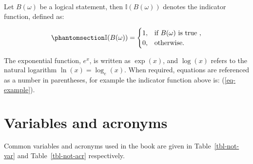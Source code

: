 \documentclass[
  letterpaper,
  krantz2]{style/krantz}
\begin{document}
Let \(B(\omega)\) be a logical statement, then \(\mathbb{I}(B(\omega))\)
denotes the indicator function, defined as:

\begin{equation}\phantomsection\label{eq-example}{
\mathbb{I}(B(\omega))=
\begin{cases}
1, & \text{if } B(\omega) \text{ is true }, \\
0, & \text{otherwise}.
\end{cases}
}\end{equation}

The exponential function, \(e^x\), is written as \(\exp(x)\), and
\(\log(x)\) refers to the natural logarithm \(\ln(x) = \log_e(x)\). When
required, equations are referenced as a number in parentheses, for
example the indicator function above is: (\ref{eq-example}).

\section*{Variables and acronyms}\label{variables-and-acronyms}


Common variables and acronyms used in the book are given in
Table~\ref{tbl-not-var} and Table~\ref{tbl-not-acr} respectively.
\end{document}
